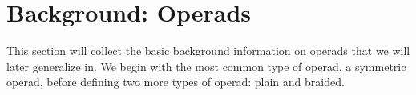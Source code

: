 

\section{Background: Operads}\label{sec:back-op}

This section will collect the basic background information on operads that we will later generalize in. We begin with the most common type of operad, a symmetric operad, before defining two more types of operad: plain and braided. 

